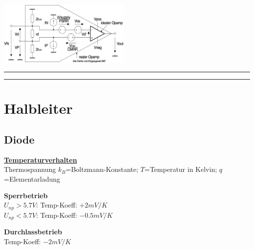         \begin{minipage}[b]{6.5cm}
            \includegraphics[width=6.5cm]{./bilder/OPAmpAlleFehler}
        \end{minipage}
\hrule
\hrule

	\section{Halbleiter}
        \subsection{Diode}
            \underline{\bf Temperaturverhalten}\\
            Thermospannung
            \hspace{15.3mm}  $k_B$=Boltzmann-Konstante; $T$=Temperatur in Kelvin; $q$=Elementarladung\\
            \begin{minipage}[T]{9cm}
                {\bf Sperrbetrieb}\\
                $U_{np} > 5.7V$: Temp-Koeff: $+2 mV/K$\\
                $U_{np} < 5.7V$: Temp-Koeff: $-0.5 mV/K$\\
            \end{minipage}
            \begin{minipage}{9cm}
                {\bf Durchlassbetrieb}\\
                Temp-Koeff: $-2 mV/K$\\
            \end{minipage}
            
